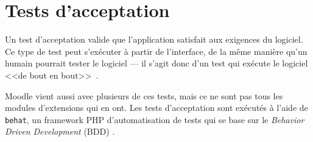 \section{Tests d'acceptation}
Un test d'acceptation valide que l'application satisfait aux exigences du logiciel.
Ce type de test peut s'ex\'ecuter \`a partir de l'interface, de la m\^eme mani\`ere qu'un humain pourrait tester le logiciel --- il s'agit donc d'un test qui ex\'ecute le logiciel <<de bout en bout>>~\cite{tremblay16}.

Moodle vient aussi avec plusieurs de ces tests, mais ce ne sont pas tous les modules d'extensions qui en ont.
%
Les tests d'acceptation sont ex\'ecut\'es \`a l'aide de \texttt{behat}, un \og framework \fg{} PHP d'automatisation de tests qui se base sur le \og \textit{Behavior Driven Development} (BDD) \fg{}.



